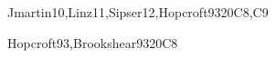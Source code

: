 \begin{syllabus}
\begin{unit}{\ALAdvancedComputationalComplexity}{}{Jmartin10,Linz11,Sipser12,Hopcroft93}{20}{C8,C9}
\begin{topics}%
	\item \ALAdvancedComputationalComplexityTopicReview
	\item \ALAdvancedComputationalComplexityTopicPolynomial
	\item \ALAdvancedComputationalComplexityTopicNp
	\item \ALAdvancedComputationalComplexityTopicClassic
	\item \ALAdvancedComputationalComplexityTopicReduction
\end{topics}
\begin{learningoutcomes}
	\item \ALAdvancedComputationalComplexityLODefineThe [\Assessment]
	\item \ALAdvancedComputationalComplexityLODefineTheClass [\Assessment]
	\item \ALAdvancedComputationalComplexityLOExplainTheNpAppears [\Assessment]
	\item \ALAdvancedComputationalComplexityLOProvide [\Assessment]
	\item \ALAdvancedComputationalComplexityLOProve [\Assessment]
\end{learningoutcomes}
\end{unit}

\begin{unit}{\ALAdvancedAutomataTheoryandComputability}{}{Hopcroft93,Brookshear93}{20}{C8}
\begin{topics}%
	\item \ALAdvancedAutomataTheoryandComputabilityTopicSets
	\item \ALAdvancedAutomataTheoryandComputabilityTopicContext
\end{topics}
\begin{learningoutcomes}
	\item \ALAdvancedAutomataTheoryandComputabilityLODetermineA [\Assessment]
	\item \ALAdvancedAutomataTheoryandComputabilityLOConvert [\Assessment]
\end{learningoutcomes}
\end{unit}

\begin{coursebibliography}
\end{coursebibliography}

\end{syllabus}
